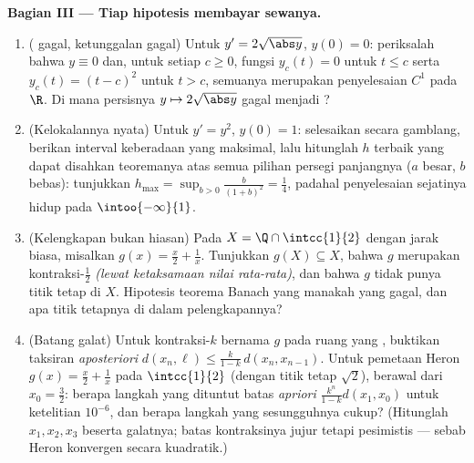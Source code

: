 \begin{problem}
\medskip
\noindent\textbf{Bagian III --- Tiap hipotesis membayar sewanya.}
\begin{enumerate}[resume]
  \item ( gagal, ketunggalan gagal) Untuk $y' =
        2\sqrt{\abs y}$, $y(0) = 0$: periksalah bahwa $y \equiv 0$
        dan, untuk setiap $c \geq 0$, fungsi $y_c(t) = 0$ untuk
        $t \leq c$ serta $y_c(t) = (t - c)^2$ untuk $t > c$, semuanya
        merupakan penyelesaian $C^1$ pada $\R$. Di mana persisnya $y
        \mapsto 2\sqrt{\abs y}$ gagal menjadi ?
  \item (Kelokalannya nyata) Untuk $y' = y^2$, $y(0) = 1$: selesaikan
        secara gamblang, berikan interval keberadaan yang maksimal, lalu
        hitunglah $h$ terbaik yang dapat disahkan teoremanya atas semua
        pilihan persegi panjangnya ($a$ besar, $b$ bebas): tunjukkan
        $h_{\max} = \sup_{b>0} \frac{b}{(1+b)^2} = \frac14$,
        padahal penyelesaian sejatinya hidup pada $\intoo{-\infty}{1}$.
  \item (Kelengkapan bukan hiasan) Pada $X = \Q \cap
        \intcc{1}{2}$ dengan jarak biasa, misalkan $g(x) =
        \frac x2 + \frac1x$. Tunjukkan $g(X) \subseteq X$, bahwa $g$
        merupakan kontraksi-$\frac12$ \emph{(lewat ketaksamaan nilai
        rata-rata)}, dan bahwa $g$ tidak punya titik tetap di $X$.
        Hipotesis teorema Banach yang manakah yang gagal, dan apa
        titik tetapnya di dalam pelengkapannya?
  \item (Batang galat) Untuk kontraksi-$k$ bernama $g$ pada ruang yang
        , buktikan taksiran \emph{aposteriori} $d(x_n,
        \ell) \leq \frac{k}{1-k}\,d(x_n, x_{n-1})$. Untuk pemetaan
        Heron $g(x) = \frac x2 + \frac 1x$ pada $\intcc{1}{2}$
        (dengan titik tetap $\sqrt2$), berawal dari $x_0 = \frac32$:
        berapa langkah yang dituntut batas \emph{apriori}
        $\frac{k^n}{1-k}d(x_1, x_0)$ untuk ketelitian
        $10^{-6}$, dan berapa langkah yang sesungguhnya cukup?
        (Hitunglah $x_1, x_2, x_3$ beserta galatnya; batas
        kontraksinya jujur tetapi pesimistis --- sebab
        Heron konvergen secara kuadratik.)
\end{enumerate}


\end{problem}
